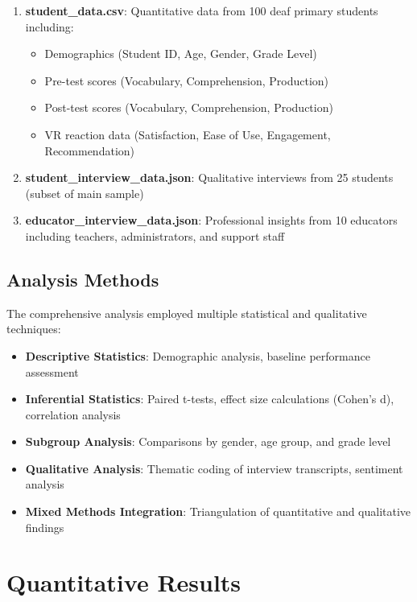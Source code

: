 \documentclass[12pt,a4paper]{article}
\begin{document}
\begin{enumerate}
    \item \textbf{student\_data.csv}: Quantitative data from 100 deaf primary students including:
    \begin{itemize}
        \item Demographics (Student ID, Age, Gender, Grade Level)
        \item Pre-test scores (Vocabulary, Comprehension, Production)
        \item Post-test scores (Vocabulary, Comprehension, Production)
        \item VR reaction data (Satisfaction, Ease of Use, Engagement, Recommendation)
    \end{itemize}
    
    \item \textbf{student\_interview\_data.json}: Qualitative interviews from 25 students (subset of main sample)
    
    \item \textbf{educator\_interview\_data.json}: Professional insights from 10 educators including teachers, administrators, and support staff
\end{enumerate}

\subsection{Analysis Methods}

The comprehensive analysis employed multiple statistical and qualitative techniques:

\begin{itemize}
    \item \textbf{Descriptive Statistics}: Demographic analysis, baseline performance assessment
    \item \textbf{Inferential Statistics}: Paired t-tests, effect size calculations (Cohen's d), correlation analysis
    \item \textbf{Subgroup Analysis}: Comparisons by gender, age group, and grade level
    \item \textbf{Qualitative Analysis}: Thematic coding of interview transcripts, sentiment analysis
    \item \textbf{Mixed Methods Integration}: Triangulation of quantitative and qualitative findings
\end{itemize}

\section{Quantitative Results}
\end{document}

